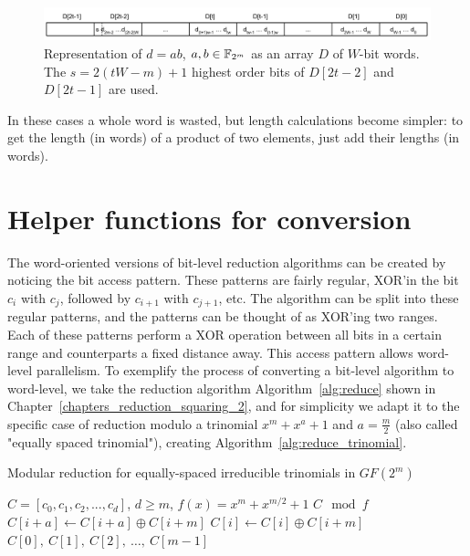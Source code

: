 \begin{figure}[H]
  \centering
  \includegraphics[width = \columnwidth]{figures/two-word-element-2.pdf}
\caption{Representation of $d = ab$, $a,b \in {\mathbb F}_{2^m}$ as an array $D$ of $W$-bit words. The $s = 2(tW-m)+1$ highest order bits of $D[2t-2]$ and $D[2t-1]$ are used.}
\label{fig:elemento:field:mult2}
\end{figure}

In these cases a whole word is wasted, but length calculations become simpler: to get the length (in words) of a product of two elements, just add their lengths (in words). \\


\section{Helper functions for conversion} \label{helper-functions}

The word-oriented versions of bit-level reduction algorithms can be created by noticing the bit access pattern. These patterns are fairly regular, XOR'in the bit $c_i$ with $c_j$, followed by $c_{i+1}$ with $c_{j+1}$, etc. The algorithm can be split into these regular patterns, and the patterns can be thought of as XOR'ing two ranges. \\

Each of these patterns perform a XOR operation between all bits in a certain range and counterparts a fixed distance away. This access pattern allows word-level parallelism. To exemplify the process of converting a bit-level algorithm to word-level, we take the reduction algorithm Algorithm~\ref{alg:reduce} shown in Chapter~\ref{chapters_reduction_squaring_2}, and for simplicity we adapt it to the specific case of reduction modulo a trinomial $x^m + x^a + 1$ and $a=\frac{m}{2}$ (also called "equally spaced trinomial"), creating Algorithm~\ref{alg:reduce_trinomial}.

\begin{algorithm}
\caption{Modular reduction for equally-spaced irreducible trinomials in $GF(2^m)$}
\label{alg:reduce_trinomial}
\begin{algorithmic}[1]
\REQUIRE $C = [c_0, c_1, c_2, ..., c_d]$, $d \geq m$, $f(x) = x^m + x^{m/2} + 1$
\ENSURE $C \mod f$
    \STATE $C[i+a] \leftarrow C[i+a] \oplus C[i+m]$
  \ENDFOR
    \STATE $C[i] \leftarrow C[i] \oplus C[i+m]$
  \ENDFOR
\RETURN $C[0],~C[1],~C[2],~\ldots,~C[m-1]$
\end{algorithmic}
\end{algorithm}

